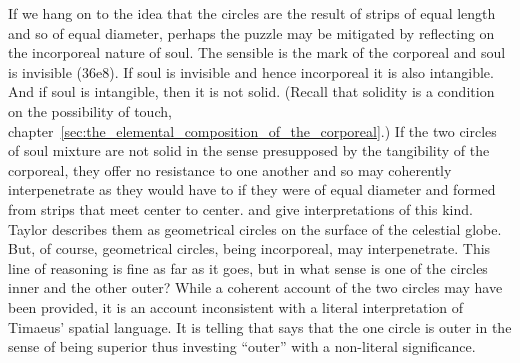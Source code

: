 If we hang on to the idea that the circles are the result of strips of equal length and so of equal diameter, perhaps the puzzle may be mitigated by reflecting on the incorporeal nature of soul. The sensible is the mark of the corporeal and soul is invisible (36e8). If soul is invisible and hence incorporeal it is also intangible. And if soul is intangible, then it is not solid. (Recall that solidity is a condition on the possibility of touch, chapter~\ref{sec:the_elemental_composition_of_the_corporeal}.) If the two circles of soul mixture are not solid in the sense presupposed by the tangibility of the corporeal, they offer no resistance to one another and so may coherently interpenetrate as they would have to if they were of equal diameter and formed from strips that meet center to center. \citet[111--2 n7]{Archer-Hind:1888qd} and \citet[148]{Taylor:1928qb} give interpretations of this kind. Taylor describes them as geometrical circles on the surface of the celestial globe. But, of course, geometrical circles, being incorporeal, may interpenetrate. This line of reasoning is fine as far as it goes, but in what sense is one of the circles inner and the other outer? While a coherent account of the two circles may have been provided, it is an account inconsistent with a literal interpretation of Timaeus' spatial language. It is telling that \citet[112 n3]{Archer-Hind:1888qd} says that the one circle is outer in the sense of being superior thus investing ``outer'' with a non-literal significance.

